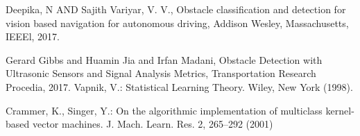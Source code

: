 \documentclass[a4paper]{report}
\begin{document}
\begin{thebibliography}{9}
          Deepika, N AND Sajith Variyar, V. V.,
          Obstacle classification and detection for vision based navigation for autonomous driving,
          Addison Wesley, Massachusetts,
          IEEEl,
          2017.
     
         
          Gerard Gibbs and Huamin Jia and Irfan Madani,
          Obstacle Detection with Ultrasonic Sensors and Signal Analysis Metrics,
          Transportation Research Procedia,
          2017.
		Vapnik, V.: Statistical Learning Theory. Wiley, New York (1998).

Crammer, K., Singer, Y.: On the algorithmic implementation of multiclass kernel-based vector machines. J. Mach. Learn. Res. 2, 265–292 (2001)


\end{thebibliography}
\end{document}
